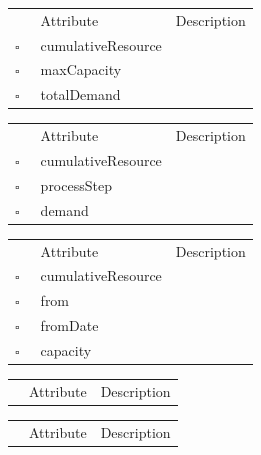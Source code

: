 \begin{table}
\caption{CumulativeLowerBound  }

\begin{longtable}{llp{8cm}}
& Attribute & Description \\
$\square$\ & cumulativeResource &  \\
$\square$\ & maxCapacity &  \\
$\square$\ & totalDemand &  \\
\end{longtable}
\label{attr:CumulativeLowerBound}
\end{table}

\begin{table}
\caption{CumulativeNeed  }

\begin{longtable}{llp{8cm}}
& Attribute & Description \\
$\square$\ & cumulativeResource &  \\
$\square$\ & processStep &  \\
$\square$\ & demand &  \\
\end{longtable}
\label{attr:CumulativeNeed}
\end{table}

\begin{table}
\caption{CumulativeProfile  }

\begin{longtable}{llp{8cm}}
& Attribute & Description \\
$\square$\ & cumulativeResource &  \\
$\square$\ & from &  \\
$\square$\ & fromDate &  \\
$\square$\ & capacity &  \\
\end{longtable}
\label{attr:CumulativeProfile}
\end{table}

\clearpage
\begin{table}
\caption{CumulativeResource  }

\begin{longtable}{llp{8cm}}
& Attribute & Description \\
\end{longtable}
\label{attr:CumulativeResource}
\end{table}

\begin{table}
\caption{DataGeneratorProperty  }

\begin{longtable}{llp{8cm}}
& Attribute & Description \\
\end{longtable}
\label{attr:DataGeneratorProperty}
\end{table}


